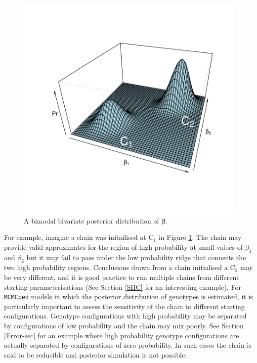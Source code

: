\documentclass{article}
\begin{document}
\begin{figure}[!h]
\begin{center}
\includegraphics{Tutorial-008}
\end{center}
\caption{A bimodal bivariate posterior distribution of $\bm{\beta}$.}
\label{densityPMM}
\end{figure}

For example, imagine a chain was initailised at $\textrm{C}_{1}$ in Figure \ref{densityPMM}. The chain may provide valid approximates for the region of high probability at small values of $\beta_{1}$ and $\beta_{2}$ but it may fail to pass under the low probability ridge that connects the two high probability regions.  Conclusions drawn from a chain initialised a $\textrm{C}_{2}$ may be very different, and it is good practice to run multiple chains from different starting parameterisations (See Section \ref{SHC} for an interesting example).  For \texttt{MCMCped} models in which the posterior distribution of genotypes is estimated, it is particularly important to assess the sensitivity of the chain to different starting configurations.  Genotype configurations with high probability may be separated by configurations of low probability and the chain may mix poorly.  See Section \ref{Error-sec} for an example where high probability genotype configurations are actually separated by configurations of zero probability.  In such cases the chain is said to be reducible and posterior simulation is not possible.
\end{document}
